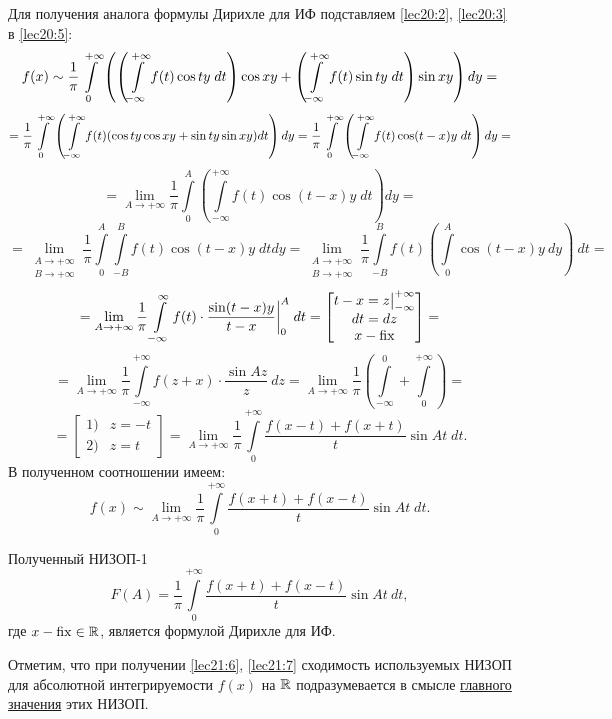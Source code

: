 \documentclass[../../main.tex]{subfiles}
\begin{document}
Для получения аналога формулы Дирихле для ИФ подставляем
\eqref{lec20:2}, \eqref{lec20:3} в \eqref{lec20:5}:
\[
f(x) \sim \dfrac{1}{\pi} \int\limits_{0}^{+\infty}
\left(
\left(\int\limits_{-\infty}^{+\infty} f(t) \cos ty\;dt\right) \cos xy +
\left(
\int\limits_{-\infty}^{+\infty} f(t) \sin ty\;dt
\right) \sin xy 
\right) dy = \] \[ =
\dfrac{1}{\pi}
\int\limits_{0}^{+\infty} \left(
\int\limits_{-\infty}^{+\infty} f(t) (\cos ty\cos xy + \sin ty\sin xy) dt
\right) dy =
\dfrac{1}{\pi} \int\limits_{0}^{+\infty} \left(
\int\limits_{-\infty}^{+\infty} f(t) \cos(t - x)y\;dt
\right) dy = \] \[ =
\lim\limits_{A \to +\infty} \dfrac{1}{\pi}
\int\limits_0^{A} \left(
\int\limits_{-\infty}^{+\infty}
f(t) \cos(t - x)y\;dt
\right) dy =
\] \[ = 
\lim\limits_{\substack{A \to +\infty \\ B \to +\infty}} \dfrac{1}{\pi}
\int\limits_0^A \int\limits_{-B}^B f(t) \cos(t-x)y\;dtdy =
\lim\limits_{\substack{A \to +\infty \\ B \to +\infty}}
\dfrac{1}{\pi} \int\limits_{-B}^B f(t) \left(
\int\limits_0^A
 \cos (t - x) y\ dy \right)\ dt =
\] \[ = 
\lim\limits_{A \to +\infty} \dfrac{1}{\pi}
\int\limits_{-\infty}^{\infty} f(t) \cdot
\dfrac{\sin (t - x)y}{t - x}\bigg|_0^A\;dt = 
\begin{bmatrix}
t - x = z \big|_{-\infty}^{+\infty}\\
dt = dz \\
x - \operatorname{fix}
\end{bmatrix} =
\] \[ = 
\lim\limits_{A \to +\infty} \dfrac{1}{\pi} 
\int\limits_{-\infty}^{+\infty} f(z + x)\cdot
\dfrac{\sin Az}{z}\ dz =
\lim\limits_{A \to +\infty} \dfrac{1}{\pi}
\left(
\int\limits_{-\infty}^{0} + 
\int\limits_{0}^{+\infty}
\right) =
\] \[ = 
\begin{bmatrix}
1)& z = -t \\
2)& z = t
\end{bmatrix} =
\lim\limits_{A \to +\infty} \dfrac{1}{\pi}
\int\limits_{0}^{+\infty}
\dfrac{f(x - t) + f(x + t)}{t} \sin At\;dt.
\]
В полученном соотношении имеем:
\begin{equation}
\label{lec21:6}
	f(x) \sim \lim\limits_{A \to +\infty} \dfrac{1}{\pi} 
	\int\limits_0^{+\infty} \dfrac{f(x + t) + f(x - t)}{t} \sin At\;dt.
\end{equation}

Полученный НИЗОП-1
\begin{equation}
\label{lec21:7}
	F(A) = \dfrac{1}{\pi} \int\limits_0^{+\infty} 
	\dfrac{f(x + t) + f(x - t)}{t} \sin At\ dt,
\end{equation}
где $ x - \operatorname{fix} \in \mathbb{R} $, является формулой Дирихле для ИФ.

Отметим, что при получении \eqref{lec21:6}, \eqref{lec21:7}
сходимость используемых НИЗОП для абсолютной интегрируемости $f(x)$ на
$\mathbb{R}$ подразумевается в смысле \underline{главного значения} этих НИЗОП.
\end{document}
